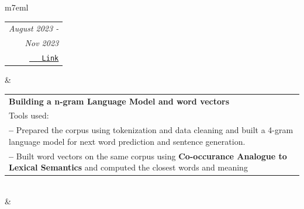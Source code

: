 \documentclass[11pt]{extarticle}
\makeatletter
\DeclareRobustCommand*\myul{%
    \def\SOUL@everyspace{\underline{\space}\kern\z@}
    \def\SOUL@everytoken{%
		\setbox0=\hbox{\the\SOUL@token}%
		\ifdim\dp0>\z@
        \the\SOUL@token
		\else
        \underline{\the\SOUL@token}%
		\fi}
\SOUL@}
\newcommand*{\githubsymbol}{%
\protect\BeginAccSupp{ActualText=GitHub:}%
{{\faGithub}~}%
\protect\EndAccSupp{}}%
\newcommand{\link}[2]{
    \BeginAccSupp{method = pdfstringdef, ActualText = {\protect\unichar{"000A}#2\protect\unichar{"000A}}}
        \href{#2}{\texttt{\ul{#1}}}
    \EndAccSupp{}
}
\makeatother
\begin{document}
\begin{longtable}[H]{m{7em}l}
{	\begin{tabular}{@{}r@{}}
			\textit{August 2023 -} \\
			\textit{Nov 2023}      \\
			\link{\githubsymbol Link}{https://github.com/Roudranil/n-gram-lm-and-word-vectors}
		\end{tabular}}    &
	\begin{tabular}{@{}p{39em}@{}}
		\textbf{{Building a n-gram Language Model and word vectors}}\\
		Tools used:\textcolor{deeporange}{\hspace{-2.7mm}\myul{Python, PyTorch, nltk}}\\
		\textbf{--} Prepared the corpus using tokenization and data cleaning and built a 4-gram language model for next word prediction and sentence generation. \\
		\textbf{--} Built word vectors on the same corpus using \textbf{Co-occurance Analogue to Lexical Semantics} and computed the closest words and meaning   \\
	\end{tabular}    \\
	&     \\
\end{longtable}
\end{document}
